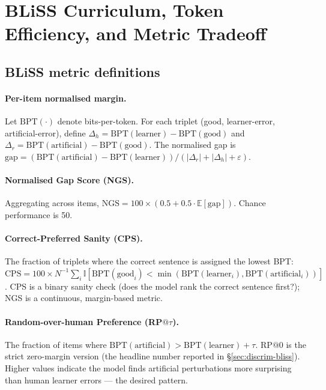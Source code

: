 \newpage 



\section{BLiSS Curriculum, Token Efficiency, and Metric Tradeoff}\label{sec:bliss-detail}

\subsection{BLiSS metric definitions}\label{sec:bliss-metric-defs}

\paragraph{Per-item normalised margin.} Let $\mathrm{BPT}(\cdot)$ denote bits-per-token. For each triplet (good, learner-error, artificial-error), define $\Delta_h = \mathrm{BPT}(\text{learner}) - \mathrm{BPT}(\text{good})$ and $\Delta_r = \mathrm{BPT}(\text{artificial}) - \mathrm{BPT}(\text{good})$. The normalised gap is $\mathrm{gap} = (\mathrm{BPT}(\text{artificial}) - \mathrm{BPT}(\text{learner}))/(|\Delta_r| + |\Delta_h| + \varepsilon)$.

\paragraph{Normalised Gap Score (NGS).} Aggregating across items, $\mathrm{NGS} = 100\times(0.5 + 0.5\cdot\mathbb{E}[\mathrm{gap}])$. Chance performance is 50.

\paragraph{Correct-Preferred Sanity (CPS).} The fraction of triplets where the correct sentence is assigned the lowest BPT: $\mathrm{CPS} = 100\times N^{-1}\sum_i \mathbb{I}[\mathrm{BPT}(\text{good}_i) < \min(\mathrm{BPT}(\text{learner}_i), \mathrm{BPT}(\text{artificial}_i))]$. CPS is a binary sanity check (does the model rank the correct sentence first?); NGS is a continuous, margin-based metric.

\paragraph{Random-over-human Preference (RP$@\tau$).} The fraction of items where $\mathrm{BPT}(\text{artificial}) > \mathrm{BPT}(\text{learner}) + \tau$. RP$@0$ is the strict zero-margin version (the headline number reported in \S\ref{sec:discrim-bliss}). Higher values indicate the model finds artificial perturbations more surprising than human learner errors --- the desired pattern.

